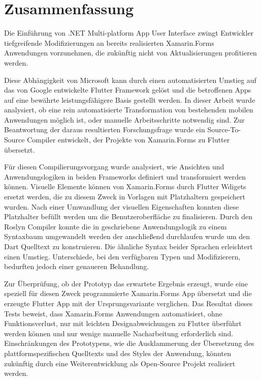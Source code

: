 
\chapter*{Zusammenfassung}
Die Einführung von .NET Multi-platform App User Interface zwingt Entwickler tiefgreifende 
Modifizierungen an bereits realisierten Xamarin.Forms Anwendungen vorzunehmen,  die zukünftig nicht von Aktualisierungen profitieren werden.  

Diese Abhängigkeit von Microsoft kann durch einen automatisierten Umstieg auf das von Google 
entwickelte Flutter Framework gelöst und die betroffenen Apps auf eine bewährte leistungsfähigere
Basis gestellt werden.  
In dieser Arbeit wurde analysiert, ob eine rein 
automatisierte Transformation von bestehenden mobilen Anwendungen möglich ist,  oder manuelle Arbeitsschritte notwendig sind.  Zur Beantwortung der daraus resultierten Forschungsfrage wurde ein Source-To-Source Compiler entwickelt,  der Projekte von Xamarin.Forms  zu Flutter übersetzt.

Für diesen Compilierungsvorgang wurde analysiert,  wie Ansichten und Anwendungslogiken in beiden Frameworks definiert und  transformiert werden können.  Visuelle Elemente können von Xamarin.Forms durch Flutter Wdigets ersetzt werden,  die zu diesem Zweck in Vorlagen mit Platzhaltern gespeichert wurden.  Nach einer Umwandlung der visuellen Eigenschaften konnten diese Platzhalter befüllt werden um die Benutzeroberfläche zu finalisieren.  
Durch den Roslyn Compiler konnte die in \Csharp{}  geschriebene Anwendungslogik zu einem Syntaxbaum umgewandelt werden der anschließend durchlaufen wurde um den Dart Quelltext zu konstruieren.  Die ähnliche Syntax beider Sprachen erleichtert einen Umstieg.   Unterschiede,  bei den verfügbaren Typen und Modifizierern,  bedurften  jedoch einer genaueren Behandlung.


Zur Überprüfung, ob der Prototyp das erwartete Ergebnis erzeugt, wurde eine speziell für diesen Zweck programmierte Xamarin.Forms App übersetzt und die erzeugte Flutter App mit der Ursprungsvariante verglichen.
Das Resultat dieses Tests beweist, dass Xamarin.Forms Anwendungen automatisiert, ohne 
Funktionsverlust, nur mit leichten Designabweichungen zu Flutter überführt werden können und nur wenige manuelle Nacharbeitung  erforderlich sind. 
Einschränkungen des Prototypens, wie die Ausklammerung der Übersetzung des 
plattformspezifischen Quelltexts und des Styles der Anwendung, könnten zukünftig durch eine 
Weiterentwicklung als Open-Source Projekt realisiert werden.

